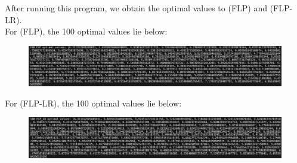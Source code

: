 \documentclass[a4paper]{article}
\begin{document}
\cite{FLP}
After running this program, we obtain the optimal values to (FLP) and (FLP-LR).\\
For (FLP), the 100 optimal values lie below:\\
\begin{figure}[H]
    \centering
    \includegraphics[width=1\linewidth]{FLP.png}
\end{figure}
For (FLP-LR), the 100 optimal values lie below:\\
\begin{figure}[H]
    \centering
    \includegraphics[width=1\linewidth]{FLP-LR.png}
\end{figure}
\end{document}
